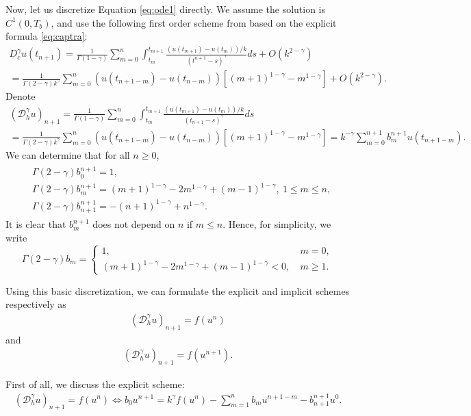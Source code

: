 \documentclass[12pt]{amsart}%
\theoremstyle{definition}
\theoremstyle{remark}
\renewcommand{\ge}{\geqslant}
\renewcommand{\le}{\leqslant}
\begin{document}
Now, let us discretize Equation \eqref{eq:ode1} directly.  We assume the solution is $C^1(0,T_b)$, and use the following first order scheme from \cite{lx07, llx11} based on the explicit formula \eqref{eq:captra}:
\begin{multline*}
D_c^{\gamma}u(t_{n+1})=\frac{1}{\Gamma(1-\gamma)}\sum_{m=0}^n\int_{t_m}^{t_{m+1}}\frac{(u(t_{m+1})-u(t_m))/k}{(t^{n+1}-s)^{\gamma}}ds+O(k^{2-\gamma})\\
=\frac{1}{\Gamma(2-\gamma)k^{\gamma}}\sum_{m=0}^{n}
(u(t_{n+1-m})-u(t_{n-m}))[(m+1)^{1-\gamma}-m^{1-\gamma}]+O(k^{2-\gamma}).
\end{multline*}
Denote
\begin{multline}
(\mathcal{D}_h^{\gamma}u)_{n+1}=\frac{1}{\Gamma(1-\gamma)}\sum_{m=0}^n\int_{t_m}^{t_{m+1}}\frac{(u(t_{m+1})-u(t_m))/k}{(t_{n+1}-s)^{\gamma}}ds\\
=\frac{1}{\Gamma(2-\gamma)k^{\gamma}}\sum_{m=0}^{n}
(u(t_{n+1-m})-u(t_{n-m}))[(m+1)^{1-\gamma}-m^{1-\gamma}]=k^{-\gamma}\sum_{m=0}^{n+1}b^{n+1}_m u(t_{n+1-m}).
\end{multline}
We can determine that for all $n\ge 0$,
\begin{gather}
\begin{split}
&\Gamma(2-\gamma)b_0^{n+1}=1, \\
&\Gamma(2-\gamma)b_m^{n+1}=(m+1)^{1-\gamma}-2m^{1-\gamma}+(m-1)^{1-\gamma},~ 1\le m\le n, \\
&\Gamma(2-\gamma)b_{n+1}^{n+1}=-(n+1)^{1-\gamma}+n^{1-\gamma}.
\end{split}
\end{gather}
It is clear that $b_{m}^{n+1}$ does not depend on $n$ if $m\le n$. Hence, for simplicity, we write \[
\Gamma(2-\gamma)b_m=
\begin{cases}
1,&m=0,\\
(m+1)^{1-\gamma}-2m^{1-\gamma}
+(m-1)^{1-\gamma}<0,~&m\ge 1.
\end{cases}
\]


Using this basic discretization, we can formulate the explicit and implicit schemes respectively as
\begin{gather}\label{eq:diffex}
(\mathcal{D}_h^{\gamma}u)_{n+1}=f(u^n)
\end{gather}
and
\begin{gather}\label{eq:diffim}
 (\mathcal{D}_h^{\gamma}u)_{n+1}=f(u^{n+1}).
\end{gather}


First of all, we discuss the explicit scheme:
\begin{gather}
(\mathcal{D}_h^{\gamma}u)_{n+1}=f(u^n)
\Leftrightarrow b_0u^{n+1}=k^{\gamma}f(u^{n})-\sum_{m=1}^n b_m u^{n+1-m}-b_{n+1}^{n+1}u^0.
\end{gather}
\end{document}
